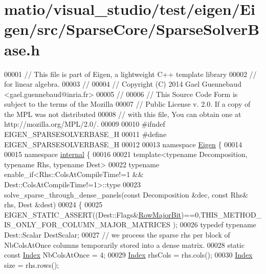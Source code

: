 \hypertarget{matio_2visual__studio_2test_2eigen_2_eigen_2src_2_sparse_core_2_sparse_solver_base_8h_source}{}\section{matio/visual\+\_\+studio/test/eigen/\+Eigen/src/\+Sparse\+Core/\+Sparse\+Solver\+Base.h}
\label{matio_2visual__studio_2test_2eigen_2_eigen_2src_2_sparse_core_2_sparse_solver_base_8h_source}

\begin{DoxyCode}
00001 \textcolor{comment}{// This file is part of Eigen, a lightweight C++ template library}
00002 \textcolor{comment}{// for linear algebra.}
00003 \textcolor{comment}{//}
00004 \textcolor{comment}{// Copyright (C) 2014 Gael Guennebaud <gael.guennebaud@inria.fr>}
00005 \textcolor{comment}{//}
00006 \textcolor{comment}{// This Source Code Form is subject to the terms of the Mozilla}
00007 \textcolor{comment}{// Public License v. 2.0. If a copy of the MPL was not distributed}
00008 \textcolor{comment}{// with this file, You can obtain one at http://mozilla.org/MPL/2.0/.}
00009 
00010 \textcolor{preprocessor}{#ifndef EIGEN\_SPARSESOLVERBASE\_H}
00011 \textcolor{preprocessor}{#define EIGEN\_SPARSESOLVERBASE\_H}
00012 
00013 \textcolor{keyword}{namespace }\hyperlink{namespace_eigen}{Eigen} \{ 
00014 
00015 \textcolor{keyword}{namespace }\hyperlink{namespaceinternal}{internal} \{
00016 
00021 \textcolor{keyword}{template}<\textcolor{keyword}{typename} Decomposition, \textcolor{keyword}{typename} Rhs, \textcolor{keyword}{typename} Dest>
00022 \textcolor{keyword}{typename} enable\_if<Rhs::ColsAtCompileTime!=1 && Dest::ColsAtCompileTime!=1>::type
00023 solve\_sparse\_through\_dense\_panels(\textcolor{keyword}{const} Decomposition &dec, \textcolor{keyword}{const} Rhs& rhs, Dest &dest)
00024 \{
00025   EIGEN\_STATIC\_ASSERT((Dest::Flags&\hyperlink{group__flags_gae4f56c2a60bbe4bd2e44c5b19cbe8762}{RowMajorBit})==0,THIS\_METHOD\_IS\_ONLY\_FOR\_COLUMN\_MAJOR\_MATRICES
      );
00026   \textcolor{keyword}{typedef} \textcolor{keyword}{typename} Dest::Scalar DestScalar;
00027   \textcolor{comment}{// we process the sparse rhs per block of NbColsAtOnce columns temporarily stored into a dense matrix.}
00028   \textcolor{keyword}{static} \textcolor{keyword}{const} \hyperlink{namespace_eigen_a62e77e0933482dafde8fe197d9a2cfde}{Index} NbColsAtOnce = 4;
00029   \hyperlink{namespace_eigen_a62e77e0933482dafde8fe197d9a2cfde}{Index} rhsCols = rhs.cols();
00030   \hyperlink{namespace_eigen_a62e77e0933482dafde8fe197d9a2cfde}{Index} size = rhs.rows();

\end{DoxyCode}

